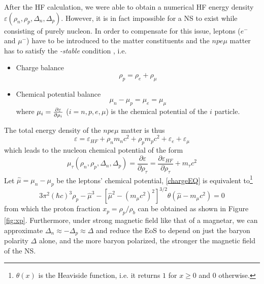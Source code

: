 After the \gls{HF} calculation, we were able to obtain a numerical \gls{HF} energy density $\varepsilon(\rho_n,\rho_p,\Delta_n,\Delta_p)$. However, it is in fact impossible for a \gls{NS} to exist while consisting of purely nucleon. In order to compensate for this issue, leptons ($e^-$ and $\mu^-$) have to be introduced to the matter constituents and the $npe\mu$ matter has to satisfy the \emph{\textbeta-stable} condition \citep{glendenning2012compact}, i.e.
\begin{itemize}
        \item Charge balance
                \begin{equation}
                        \rho_p = \rho_e + \rho_\mu
                        \label{chargeEQ}
                \end{equation}
        \item Chemical potential balance
                \begin{equation}
                        \mu_n - \mu_p = \mu_e = \mu_\mu
                \end{equation}
                where $\mu_i = \pdv{\varepsilon}{\rho_i}$ ($i=n,p,e,\mu$) is the chemical potential of the $i$ particle.
\end{itemize}
The total energy density of the $npe\mu$ matter is thus
\begin{equation}
        \varepsilon = \varepsilon_{HF} + \rho_n m_n c^2 + \rho_p m_p c^2 + \varepsilon_e + \varepsilon_\mu 
\end{equation}
which leads to the nucleon chemical potential of the form
\begin{equation}
        \mu_\tau (\rho_n,\rho_p,\Delta_n,\Delta_p) = \frac{\partial \varepsilon}{\partial \rho_\tau}  = \frac{\partial \varepsilon_{HF}}{\partial \rho_\tau} + m_\tau c^2
\end{equation}
Let $\hat{\mu} = \mu_n - \mu_p$ be the leptons' chemical potential, \eqref{chargeEQ} is equivalent to\footnote{$\theta(x)$ is the Heaviside function, i.e. it returns $1$ for $x\geq 0$ and $0$ otherwise.}
\begin{equation}
        3\pi^2 (\hbar c)^3 \rho_p - \hat{\mu}^3 - \left[ \hat{\mu}^2 - (m_\mu c^2)^2 \right]^{3/2} \theta(\hat{\mu} - m_\mu c^2) = 0
\end{equation}
from which the proton fraction $x_p = \rho_p/\rho_b$ can be obtained as shown in Figure \ref{fig:xp}. Furthermore, under strong magnetic field like that of a magnetar, we can approximate $\Delta_n \approx -\Delta_p \approx \Delta$ and reduce the \gls{EoS} to depend on just the baryon polarity $\Delta$ alone, and the more baryon polarized, the stronger the magnetic field of the \gls{NS}.\par
